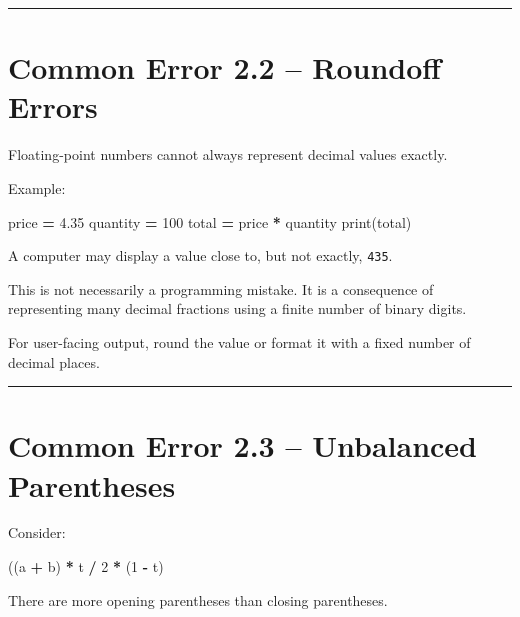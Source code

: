 \documentclass[
]{article}
\newenvironment{Shaded}{\begin{snugshade}}{\end{snugshade}}
\newcommand{\BuiltInTok}[1]{#1}
\newcommand{\DecValTok}[1]{\textcolor[rgb]{0.00,0.00,0.81}{#1}}
\newcommand{\FloatTok}[1]{\textcolor[rgb]{0.00,0.00,0.81}{#1}}
\newcommand{\NormalTok}[1]{#1}
\newcommand{\OperatorTok}[1]{\textcolor[rgb]{0.81,0.36,0.00}{\textbf{#1}}}
\begin{document}
\begin{center}\rule{0.5\linewidth}{0.5pt}\end{center}

\section{Common Error 2.2 -- Roundoff
Errors}\label{common-error-2.2-roundoff-errors}

Floating-point numbers cannot always represent decimal values exactly.

Example:

\begin{Shaded}
\begin{Highlighting}[]
\NormalTok{price }\OperatorTok{=} \FloatTok{4.35}
\NormalTok{quantity }\OperatorTok{=} \DecValTok{100}
\NormalTok{total }\OperatorTok{=}\NormalTok{ price }\OperatorTok{*}\NormalTok{ quantity}
\BuiltInTok{print}\NormalTok{(total)}
\end{Highlighting}
\end{Shaded}

A computer may display a value close to, but not exactly, \texttt{435}.

This is not necessarily a programming mistake. It is a consequence of
representing many decimal fractions using a finite number of binary
digits.

For user-facing output, round the value or format it with a fixed number
of decimal places.

\begin{center}\rule{0.5\linewidth}{0.5pt}\end{center}

\section{Common Error 2.3 -- Unbalanced
Parentheses}\label{common-error-2.3-unbalanced-parentheses}

Consider:

\begin{Shaded}
\begin{Highlighting}[]
\NormalTok{((a }\OperatorTok{+}\NormalTok{ b) }\OperatorTok{*}\NormalTok{ t }\OperatorTok{/} \DecValTok{2} \OperatorTok{*}\NormalTok{ (}\DecValTok{1} \OperatorTok{{-}}\NormalTok{ t)}
\end{Highlighting}
\end{Shaded}

There are more opening parentheses than closing parentheses.
\end{document}
